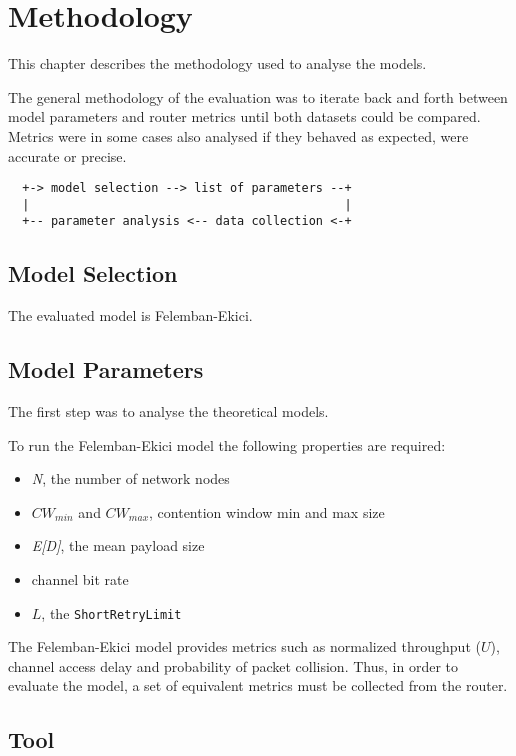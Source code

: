 \chapter{Methodology}

This chapter describes the methodology used to analyse the models.

The general methodology of the evaluation was to iterate back and forth between model parameters and router metrics until both datasets could be compared. Metrics were in some cases also analysed if they behaved as expected, were accurate or precise.

\begin{verbatim}
  +-> model selection --> list of parameters --+
  |                                            |
  +-- parameter analysis <-- data collection <-+
\end{verbatim}

\section{Model Selection}

The evaluated model is Felemban-Ekici.

\section{Model Parameters}
The first step was to analyse the theoretical models.

To run the Felemban-Ekici model the following properties are required:

\begin{itemize}
	\item \emph{N}, the number of network nodes
	\item $CW_{min}$ and $CW_{max}$, contention window min and max size
	\item \emph{E[D]}, the mean payload size
	\item channel bit rate
	\item $L$, the \texttt{ShortRetryLimit}
\end{itemize}

The Felemban-Ekici model provides metrics such as normalized throughput ($U$), channel access delay and probability of packet collision. Thus, in order to evaluate the model, a set of equivalent metrics must be collected from the router.

\section{Tool}

